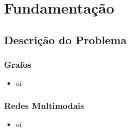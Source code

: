 \section{Fundamentação}

\subsection{Descrição do Problema}
\frame
{
\frametitle{Grafos}
\begin{itemize}
	\item oi
\end{itemize}
}

\frame
{
\frametitle{Redes Multimodais}
\begin{itemize}
	\item oi
\end{itemize}
}
